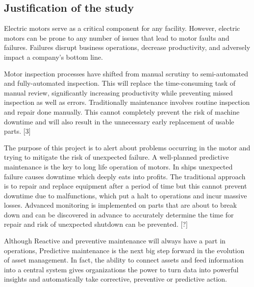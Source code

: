 \subsection{Justification of the study}
Electric motors serve as a critical component for any facility. However, electric motors can be prone to any number of issues that lead to motor faults and failures. Failures disrupt business operations, decrease productivity, and adversely impact a company’s bottom line. 

Motor inspection processes have shifted from manual scrutiny to semi-automated and fully-automated inspection. This will replace the time-consuming task of manual review, significantly increasing productivity while preventing missed inspection as well as errors. Traditionally maintenance involves routine inspection and repair done manually. This cannot completely prevent the risk of machine downtime and will also result in the unnecessary early replacement of usable parts. [3] 


The purpose of this project is to alert about problems occurring in the motor and trying to mitigate the risk of unexpected failure. A well-planned predictive maintenance is the key to long life operation of motors. In ships unexpected failure causes downtime which deeply eats into profits. The traditional approach is to repair and replace equipment after a period of time but this cannot prevent downtime due to malfunctions, which put a halt to operations and incur massive losses. Advanced monitoring is implemented on parts that are about to break down and can be discovered in advance to accurately determine the time for repair and risk of unexpected shutdown can be prevented. [?] 

Although Reactive and preventive maintenance will always have a part in operations, Predictive maintenance is the next big step forward in the evolution of asset management. In fact, the ability to connect assets and feed information into a central system gives organizations the power to turn data into powerful insights and automatically take corrective, preventive or predictive action.
